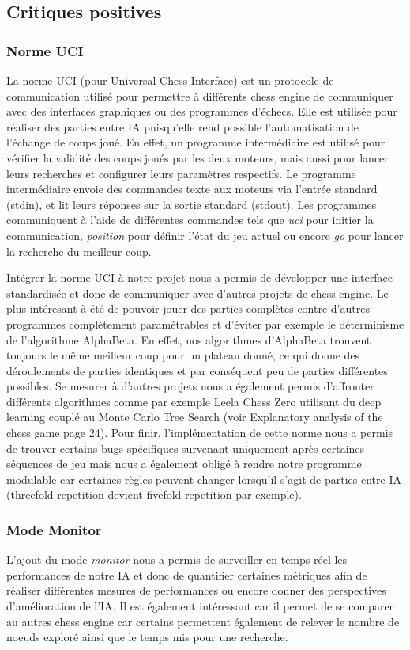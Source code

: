 \documentclass{article}
\begin{document}
\subsection{Critiques positives}
\subsubsection{Norme UCI}
La norme UCI (pour Universal Chess Interface) est un protocole de communication utilisé pour permettre à différents chess engine de communiquer avec des interfaces graphiques ou des programmes d’échecs.
Elle est utilisée pour réaliser des parties entre IA puisqu'elle rend possible l'automatisation de l'échange de coups joué. En effet, un programme intermédiaire est utilisé pour vérifier la validité des
coups joués par les deux moteurs, mais aussi pour lancer leurs recherches et configurer leurs paramètres respectifs. Le programme intermédiaire envoie des commandes texte aux moteurs via l’entrée standard (stdin), 
et lit leurs réponses sur la sortie standard (stdout). Les programmes communiquent à l'aide de différentes commandes tels que \textit{uci} pour initier la communication, \textit{position} pour définir 
l'état du jeu actuel ou encore \textit{go} pour lancer la recherche du meilleur coup.

Intégrer la norme UCI à notre projet nous a permis de développer une interface standardisée et donc de communiquer avec d'autres projets de chess engine.
Le plus intéresant à été de pouvoir jouer des parties complètes contre d'autres programmes complètement paramétrables et d'éviter par exemple le déterminisme
de l'algorithme AlphaBeta. En effet, nos algorithmes d'AlphaBeta trouvent toujours le même meilleur coup pour un plateau donné, ce qui donne des déroulements de parties
identiques et par conséquent peu de parties différentes possibles. Se mesurer à d'autres projets nous a également permis d'affronter différents algorithmes comme par exemple
Leela Chess Zero utilisant du deep learning couplé au Monte Carlo Tree Search (voir Explanatory analysis of the chess game \cite{GameEngine} page 24).
Pour finir, l'implémentation de cette norme nous a permis de trouver certains bugs spécifiques survenant uniquement après certaines séquences de jeu mais nous a également
obligé à rendre notre programme modulable car certaines règles peuvent changer lorsqu'il s'agit de parties entre IA (threefold repetition devient fivefold repetition par exemple).
\subsubsection{Mode Monitor}
L'ajout du mode \textit{monitor} nous a permis de surveiller en temps réel les performances de notre IA et donc de quantifier certaines métriques afin de réaliser différentes mesures de
performances ou encore donner des perspectives d'amélioration de l'IA. Il est également intéressant car il permet de se comparer au autres chess engine car certains permettent également 
de relever le nombre de noeuds exploré ainsi que le temps mis pour une recherche.
\end{document}
